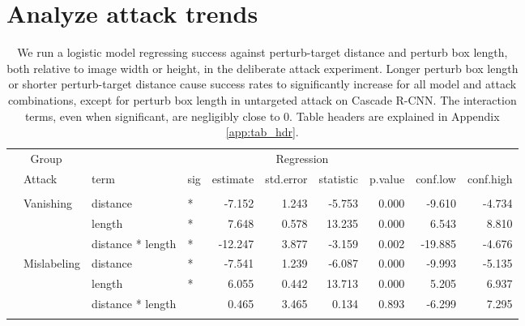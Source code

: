 \section{Analyze attack trends}\label{analyze-attack-trends}

\begingroup\fontsize{9}{11}\selectfont

\begin{longtable}[t]{llllrrrrrr}
\caption{\label{tab:arbitrary_trend_table}We run a logistic model regressing success against perturb-target distance and perturb box length, both relative to image width or height, in the deliberate attack experiment. Longer perturb box length or shorter perturb-target distance cause success rates to significantly increase for all model and attack combinations, except for perturb box length in untargeted attack on Cascade R-CNN. The interaction terms, even when significant, are negligibly close to 0. Table headers are explained in Appendix \ref{app:tab_hdr}.}\\
\toprule
\multicolumn{2}{c}{Group} & \multicolumn{8}{c}{Regression} \\
\cmidrule(l{3pt}r{3pt}){1-2} \cmidrule(l{3pt}r{3pt}){3-10}
 & Attack & term & sig & estimate & std.error & statistic & p.value & conf.low & conf.high\\
\midrule
\addlinespace[0.3em]
\multicolumn{10}{l}{\textbf{YOLOv3}}\\
\hspace{1em} & Vanishing & distance & * & -7.152 & 1.243 & -5.753 & 0.000 & -9.610 & -4.734\\
\cmidrule{3-10}\nopagebreak
\hspace{1em} &  & length & * & 7.648 & 0.578 & 13.235 & 0.000 & 6.543 & 8.810\\
\cmidrule{3-10}\nopagebreak
\hspace{1em} &  & distance * length & * & -12.247 & 3.877 & -3.159 & 0.002 & -19.885 & -4.676\\
\cmidrule{2-10}\nopagebreak
\hspace{1em} & Mislabeling & distance & * & -7.541 & 1.239 & -6.087 & 0.000 & -9.993 & -5.135\\
\cmidrule{3-10}\nopagebreak
\hspace{1em} &  & length & * & 6.055 & 0.442 & 13.713 & 0.000 & 5.205 & 6.937\\
\cmidrule{3-10}\nopagebreak
\hspace{1em} &  & distance * length &  & 0.465 & 3.465 & 0.134 & 0.893 & -6.299 & 7.295\\
\cmidrule{2-10}\nopagebreak

\end{longtable}
